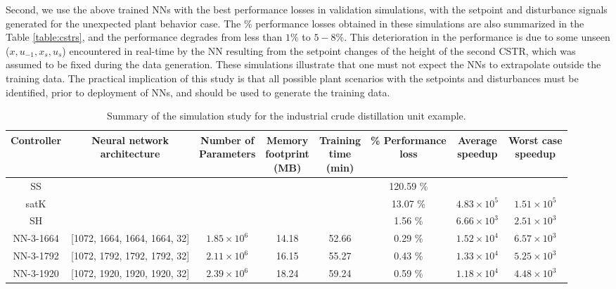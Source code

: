\documentclass[preprint,5p, twocolumn, authoryear]{elsarticle}
\begin{document}
Second, we use the above trained NNs with the best performance losses in
validation simulations, with the setpoint and disturbance signals generated for
the unexpected plant behavior case. The $\%$ performance losses obtained in
these simulations are also summarized in the Table \ref{table:cstrs}, and the
performance degrades from less than $1\%$ to $5-8\%$. This deterioration in the
performance is due to some unseen ($x, u_{-1}, x_s, u_s$) encountered in
real-time by the NN resulting from the setpoint changes of the height of the
second CSTR, which was assumed to be fixed during the data generation. These
simulations illustrate that one must not expect the NNs to extrapolate outside
the training data. The practical implication of this study is that all possible
plant scenarios with the setpoints and disturbances must be identified, prior to
deployment of NNs, and should be used to generate the training data.

\begin{table}[t]
    \caption{Summary of the simulation study for the industrial crude
    distillation unit example.}
\begin{tabular}{ |c|c|c|c|c|c|c|c| }
          \hline
          Controller & \thead{Neural network \\ architecture} & \thead{Number of
          \\ Parameters} & \thead{Memory \\ footprint \\ (MB)} & \thead{Training
          \\ time \\ (min)} & \thead{\% Performance\\ loss} & \thead{Average \\
          speedup} & \thead{Worst case \\ speedup} \\
          \hline
      SS &  &  & &  & 120.59 \% &  & \\ 
  satK &  &  &   &  & 13.07 \% & $4.83 \times 10^5$ & $1.51 \times 10^5$ \\ 
  SH &  &  &  &  & 1.56 \% & $6.66 \times 10^3$  & $2.51 \times 10^3$ \\ 
  NN-3-1664 & [1072, 1664, 1664, 1664, 32] & $1.85 \times 10^6$ & 14.18 & 52.66
  & 0.29 \% & $1.52 \times 10^4$ & $6.57 \times 10^3$  \\ 
  NN-3-1792 & [1072, 1792, 1792, 1792, 32]  & $2.11 \times 10^6$ & 16.15  &
  55.27 & 0.43 \% & $1.33 \times 10^4$ & $5.25 \times 10^3$ \\ 
  NN-3-1920 & [1072, 1920, 1920, 1920, 32]  & $2.39 \times 10^6$ & 18.24  &
  59.24 & 0.59 \% & $1.18 \times 10^4$ & $4.48 \times 10^3$ \\ 
\hline
\end{tabular}
\label{table:cdu}      
\end{table}
\end{document}
